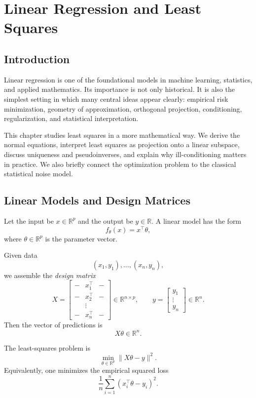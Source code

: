 \chapter{Linear Regression and Least Squares}

\section{Introduction}

Linear regression is one of the foundational models in machine learning, statistics, and applied mathematics. Its importance is not only historical. It is also the simplest setting in which many central ideas appear clearly: empirical risk minimization, geometry of approximation, orthogonal projection, conditioning, regularization, and statistical interpretation.

This chapter studies least squares in a more mathematical way. We derive the normal equations, interpret least squares as projection onto a linear subspace, discuss uniqueness and pseudoinverses, and explain why ill-conditioning matters in practice. We also briefly connect the optimization problem to the classical statistical noise model.

\section{Linear Models and Design Matrices}

Let the input be $x\in\mathbb R^p$ and the output be $y\in\mathbb R$. A linear model has the form
\[
f_\theta(x)=x^\top \theta,
\]
where $\theta\in\mathbb R^p$ is the parameter vector.

Given data
\[
(x_1,y_1),\dots,(x_n,y_n),
\]
we assemble the \emph{design matrix}
\[
X=
\begin{bmatrix}
- & x_1^\top & -\\
- & x_2^\top & -\\
& \vdots & \\
- & x_n^\top & -
\end{bmatrix}
\in\mathbb R^{n\times p},
\qquad
y=
\begin{bmatrix}
y_1\\ \vdots\\ y_n
\end{bmatrix}\in\mathbb R^n.
\]
Then the vector of predictions is
\[
X\theta \in \mathbb R^n.
\]

The least-squares problem is
\[
\min_{\theta\in\mathbb R^p} \|X\theta-y\|^2.
\]
Equivalently, one minimizes the empirical squared loss
\[
\frac1n\sum_{i=1}^n (x_i^\top\theta-y_i)^2.
\]

